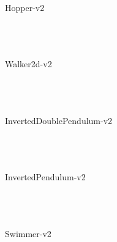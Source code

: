 \documentclass[tikz]{standalone}
\begin{document}
Hopper-v2
\newpage
\\
\newpage
\\
\newpage
\\
\newpage
\\
\newpage

Walker2d-v2
\newpage
\\
\newpage
\\
\newpage
\\
\newpage
\\
\newpage

InvertedDoublePendulum-v2
\newpage
\\
\newpage
\\
\newpage
\\
\newpage
\\
\newpage

InvertedPendulum-v2
\newpage
\\
\newpage
\\
\newpage
\\
\newpage
\\
\newpage

Swimmer-v2
\newpage
\\
\newpage
\\
\newpage
\\
\newpage
\\
\end{document}
